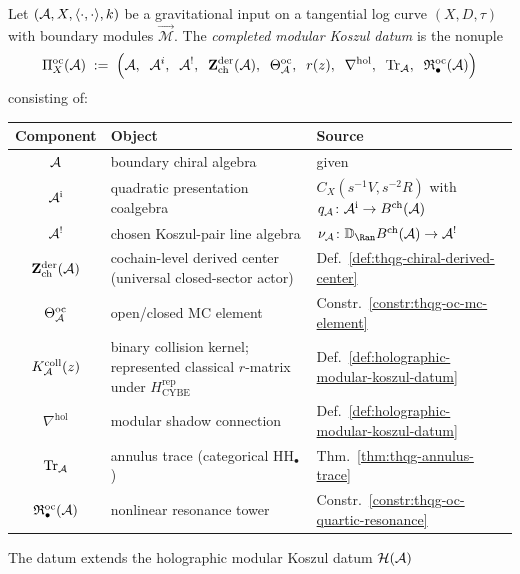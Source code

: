 \begin{definition}
\label{def:thqg-completed-platonic-datum}
Let $(\mathcal{A}, X, \langle \cdot, \cdot \rangle, k)$ be a gravitational
input on a tangential log curve $(X, D, \tau)$ with boundary
modules $\vec{\mathcal{M}}$. The \emph{completed modular Koszul datum}
is the nonuple
\begin{equation}\label{eq:thqg-completed-platonic}
\Pi^{\mathrm{oc}}_X(\mathcal{A})
\;:=\;
\Bigl(
\mathcal{A},\;\;
\mathcal{A}^i,\;\;
\mathcal{A}^!,\;\;
\mathbf{Z}^{\mathrm{der}}_{\mathrm{ch}}(\mathcal{A}),\;\;
\Theta^{\mathrm{oc}}_{\mathcal{A}},\;\;
r(z),\;\;
\nabla^{\mathrm{hol}},\;\;
\operatorname{Tr}_{\mathcal{A}},\;\;
\mathfrak{R}^{\mathrm{oc}}_{\bullet}(\mathcal{A})
\Bigr)
\end{equation}
consisting of:
\begin{center}
\renewcommand{\arraystretch}{1.3}
\small
\begin{tabular}{cll}
\textbf{Component} & \textbf{Object} & \textbf{Source} \\
\hline
$\mathcal{A}$ & boundary chiral algebra & given \\
$\mathcal{A}^{\mathrm i}$ & quadratic presentation coalgebra
 & $C_X(s^{-1}V,s^{-2}R)$ with $q_{\mathcal{A}}\colon\mathcal{A}^{\mathrm i}\to B^{\mathrm{ch}}(\mathcal{A})$ \\
$\mathcal{A}^!$ & chosen Koszul-pair line algebra
 & $\nu_\cA\colon\mathbb D_{\Ran}B^{\mathrm{ch}}(\cA)\to\cA^!$ \\
$\mathbf{Z}^{\mathrm{der}}_{\mathrm{ch}}(\mathcal{A})$
 & cochain-level derived center (universal closed-sector actor)
 & Def.~\ref{def:thqg-chiral-derived-center} \\
$\Theta^{\mathrm{oc}}_{\mathcal{A}}$
 & open/closed MC element & Constr.~\ref{constr:thqg-oc-mc-element} \\
$K_{\mathcal{A}}^{\mathrm{coll}}(z)$ & binary collision kernel; represented
classical $r$-matrix under $H_{\mathrm{CYBE}}^{\mathrm{rep}}$
 & Def.~\ref{def:holographic-modular-koszul-datum} \\
$\nabla^{\mathrm{hol}}$
 & modular shadow connection & Def.~\ref{def:holographic-modular-koszul-datum} \\
$\operatorname{Tr}_{\mathcal{A}}$
 & annulus trace (categorical $\mathrm{HH}_\bullet$)
 & Thm.~\ref{thm:thqg-annulus-trace} \\
$\mathfrak{R}^{\mathrm{oc}}_\bullet(\mathcal{A})$
 & nonlinear resonance tower & Constr.~\ref{constr:thqg-oc-quartic-resonance}
\end{tabular}
\end{center}
The datum extends the holographic modular Koszul datum
$\mathcal{H}(\mathcal{A})$

\end{definition}
